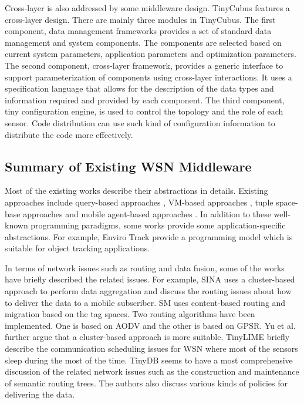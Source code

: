 Cross-layer is also addressed by some middleware design. TinyCubus \cite{tinycubus} features a cross-layer design. There are mainly three modules in TinyCubus. The first component, data management frameworks provides a set of standard data management and system components. The components are selected based on current system parameters, application parameters and optimization parameters. The second component, cross-layer framework, provides a generic interface to support parameterization of components using cross-layer interactions. It uses a specification language that allows for the description of the data types and information required and provided by each component. The third component, tiny configuration engine, is used to control the topology and the role of each sensor. Code distribution can use such kind of configuration information to distribute the code more effectively.

\subsection{Summary of Existing WSN Middleware}
Most of the existing works describe their abstractions in details. Existing approaches include query-based approaches \cite{cougar, sina, tinydb}, VM-based approaches \cite{magnetos, mate, smartmessage}, tuple space-base approaches \cite{tinylime} and mobile agent-based approaches \cite{agilla, sensorware}. In addition to these well-known programming paradigms, some works provide some application-specific abstractions. For example, Enviro Track \cite{envirotrack} provide a programming model which is suitable for object tracking applications.

In terms of network issues such as routing and data fusion, some of the works have briefly described the related issues. For example, SINA \cite{sina} uses a cluster-based approach to perform data aggregation and discuss the routing issues about how to deliver the data to a mobile subscriber. SM \cite{smartmessage} uses content-based routing and migration based on the tag spaces. Two routing algorithms have been implemented. One is based on AODV and the other is based on GPSR. Yu et al. \cite{clustermiddleware} further argue that a cluster-based approach is more suitable. TinyLIME \cite{tinylime} briefly describe the communication scheduling issues for WSN where most of the sensors sleep during the most of the time. TinyDB \cite{tinydb} seems to have a most comprehensive discussion of the related network issues such as the construction and maintenance of semantic routing trees. The authors also discuss various kinds of policies for delivering the data.

